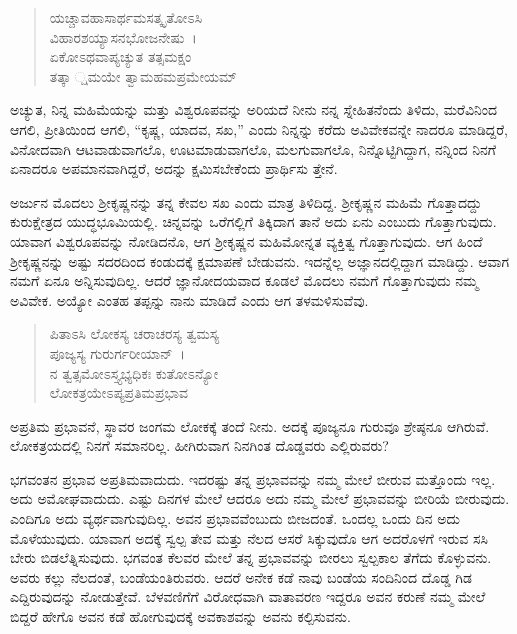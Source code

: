 \begin{verse}
ಯಚ್ಚಾವಹಾಸಾರ್ಥಮಸತ್ಕೃತೋಽಸಿ \\ ವಿಹಾರಶಯ್ಯಾಸನಭೋಜನೇಷು~।\\ಏಕೋಽಥವಾಪ್ಯಚ್ಯುತ ತತ್ಸಮಕ್ಷಂ \\ ತತ್ಕಾ ್ಷಮಯೇ ತ್ವಾಮಹಮಪ್ರಮೇಯಮ್ 
\end{verse}

{\small ಅಚ್ಯುತ, ನಿನ್ನ ಮಹಿಮೆಯನ್ನು ಮತ್ತು ವಿಶ್ವರೂಪವನ್ನು ಅರಿಯದೆ ನೀನು ನನ್ನ ಸ್ನೇಹಿತನೆಂದು ತಿಳಿದು, ಮರೆವಿನಿಂದ ಆಗಲಿ, ಪ್ರೀತಿಯಿಂದ ಆಗಲಿ, “ಕೃಷ್ಣ, ಯಾದವ, ಸಖ,” ಎಂದು ನಿನ್ನನ್ನು ಕರೆದು ಅವಿವೇಕವನ್ನೇ ನಾದರೂ ಮಾಡಿದ್ದರೆ, ವಿನೋದವಾಗಿ ಆಟವಾಡುವಾಗಲೊ, ಊಟಮಾಡುವಾಗಲೊ, ಮಲಗುವಾಗಲೊ, ನಿನ್ನೊಟ್ಟಿಗಿದ್ದಾಗ, ನನ್ನಿಂದ ನಿನಗೆ ಏನಾದರೂ ಅಪಮಾನವಾಗಿದ್ದರೆ, ಅದನ್ನು ಕ್ಷಮಿಸಬೇಕೆಂದು ಪ್ರಾರ್ಥಿಸು ತ್ತೇನೆ.}

ಅರ್ಜುನ ಮೊದಲು ಶ‍್ರೀಕೃಷ್ಣನನ್ನು ತನ್ನ ಕೇವಲ ಸಖ ಎಂದು ಮಾತ್ರ ತಿಳಿದಿದ್ದ. ಶ‍್ರೀಕೃಷ್ಣನ ಮಹಿಮೆ ಗೊತ್ತಾದದ್ದು ಕುರುಕ್ಷೇತ್ರದ ಯುದ್ಧಭೂಮಿಯಲ್ಲಿ. ಚಿನ್ನವನ್ನು ಒರೆಗಲ್ಲಿಗೆ ತಿಕ್ಕಿದಾಗ ತಾನೆ ಅದು ಏನು ಎಂಬುದು ಗೊತ್ತಾಗುವುದು. ಯಾವಾಗ ವಿಶ್ವರೂಪವನ್ನು ನೋಡಿದನೊ, ಆಗ ಶ‍್ರೀಕೃಷ್ಣನ ಮಹಿಮೋನ್ನತ ವ್ಯಕ್ತಿತ್ವ ಗೊತ್ತಾಗುವುದು. ಆಗ ಹಿಂದೆ ಶ‍್ರೀಕೃಷ್ಣನನ್ನು ಅಷ್ಟು ಸದರದಿಂದ ಕಂಡುದಕ್ಕೆ ಕ್ಷಮಾಪಣೆ ಬೇಡುವನು. ಇದನ್ನೆಲ್ಲ ಅಜ್ಞಾನದಲ್ಲಿದ್ದಾಗ ಮಾಡಿದ್ದು. ಆವಾಗ ನಮಗೆ ಏನೂ ಅನ್ನಿಸುವುದಿಲ್ಲ. ಆದರೆ ಜ್ಞಾನೋದಯವಾದ ಕೂಡಲೆ ಮೊದಲು ನಮಗೆ ಗೊತ್ತಾಗುವುದು ನಮ್ಮ ಅವಿವೇಕ. ಅಯ್ಯೋ ಎಂತಹ ತಪ್ಪನ್ನು ನಾನು ಮಾಡಿದೆ ಎಂದು ಆಗ ತಳಮಳಿಸುವೆವು.

\begin{verse}
ಪಿತಾಽಸಿ ಲೋಕಸ್ಯ ಚರಾಚರಸ್ಯ ತ್ವಮಸ್ಯ \\ ಪೂಜ್ಯಸ್ಯ ಗುರುರ್ಗರೀಯಾನ್~।\\ನ ತ್ವತ್ಸಮೋಽಸ್ತ್ಯಭ್ಯಧಿಕಃ ಕುತೋಽನ್ಯೋ \\ ಲೋಕತ್ರಯೇಽಪ್ಯಪ್ರತಿಮಪ್ರಭಾವ 
\end{verse}

{\small ಅಪ್ರತಿಮ ಪ್ರಭಾವನೆ, ಸ್ಥಾವರ ಜಂಗಮ ಲೋಕಕ್ಕೆ ತಂದೆ ನೀನು. ಅದಕ್ಕೆ ಪೂಜ್ಯನೂ ಗುರುವೂ ಶ್ರೇಷ್ಠನೂ ಆಗಿರುವೆ. ಲೋಕತ್ರಯದಲ್ಲಿ ನಿನಗೆ ಸಮಾನರಿಲ್ಲ. ಹೀಗಿರುವಾಗ ನಿನಗಿಂತ ದೊಡ್ಡವರು ಎಲ್ಲಿರುವರು?}

ಭಗವಂತನ ಪ್ರಭಾವ ಅಪ್ರತಿಮವಾದುದು. ಇದರಷ್ಟು ತನ್ನ ಪ್ರಭಾವವನ್ನು ನಮ್ಮ ಮೇಲೆ ಬೀರುವ ಮತ್ತೊಂದು ಇಲ್ಲ. ಅದು ಅಮೋಘವಾದುದು. ಎಷ್ಟು ದಿನಗಳ ಮೇಲೆ ಆದರೂ ಅದು ನಮ್ಮ ಮೇಲೆ ಪ್ರಭಾವವನ್ನು ಬೀರಿಯೆ ಬೀರುವುದು. ಎಂದಿಗೂ ಅದು ವ್ಯರ್ಥವಾಗುವುದಿಲ್ಲ. ಅವನ ಪ್ರಭಾವವೆಂಬುದು ಬೀಜದಂತೆ. ಒಂದಲ್ಲ ಒಂದು ದಿನ ಅದು ಮೊಳೆಯುವುದು. ಯಾವಾಗ ಅದಕ್ಕೆ ಸ್ವಲ್ಪ ತೇವ ಮತ್ತು ನೆಲದ ಆಸರೆ ಸಿಕ್ಕುವುದೊ ಆಗ ಅದರೊಳಗೆ ಇರುವ ಸಸಿ ಬೇರು ಬಿಡಲೆತ್ನಿಸುವುದು. ಭಗವಂತ ಕೆಲವರ ಮೇಲೆ ತನ್ನ ಪ್ರಭಾವವನ್ನು ಬೀರಲು ಸ್ವಲ್ಪಕಾಲ ತೆಗೆದು ಕೊಳ್ಳುವನು. ಅವರು ಕಲ್ಲು ನೆಲದಂತೆ, ಬಂಡೆಯಂತಿರುವರು. ಆದರೆ ಅನೇಕ ಕಡೆ ನಾವು ಬಂಡೆಯ ಸಂದಿನಿಂದ ದೊಡ್ಡ ಗಿಡ ಎದ್ದಿರುವುದನ್ನು ನೋಡುತ್ತೇವೆ. ಬೆಳವಣಿಗೆಗೆ ವಿರೋಧವಾಗಿ ವಾತಾವರಣ ಇದ್ದರೂ ಅವನ ಕರುಣೆ ನಮ್ಮ ಮೇಲೆ ಬಿದ್ದರೆ ಹೇಗೊ ಅವನ ಕಡೆ ಹೋಗುವುದಕ್ಕೆ ಅವಕಾಶವನ್ನು ಅವನು ಕಲ್ಪಿಸುವನು.

